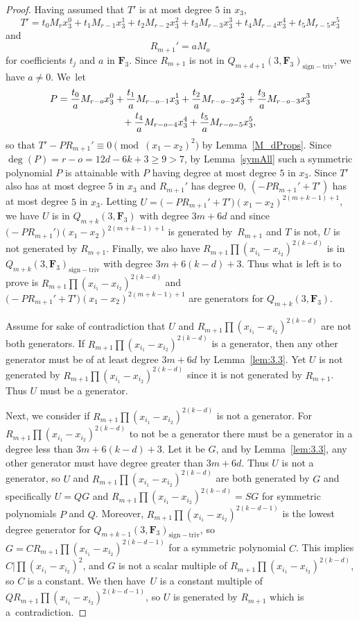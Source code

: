 \documentclass[pdftex]{sigma}
\theoremstyle{definition}
\numberwithin{equation}{section}
\newcommand{\siv}{\mathrm{sign-triv}}
\begin{document}
\begin{proof}
 Having assumed that $T'$ is at most degree $5$ in $x_3$,
 \[T' = t_0M_rx_3^0+t_1M_{r-1}x_3^1+t_2M_{r-2}x_3^2+t_3M_{r-3}x_3^3+t_4M_{r-4}x_3^4+t_5M_{r-5}x_3^5\]
 and
 \[R_{m+1}'=aM_{o}\]
 for coefficients $t_j$ and $a$ in $\mathbf{F}_3$. Since $R_{m+1}$ is not in $Q_{m+d+1}(3,\mathbf{F}_3)_{\siv}$, we have $a\neq 0$. We~let
 \begin{gather*}
 P = \frac{t_0}{a}M_{r-o}x_3^0+\frac{t_1}{a}M_{r-o-1}x_3^1+\frac{t_2}{a}M_{r-o-2}x_3^2+\frac{t_3}{a}M_{r-o-3}x_3^3\\
 \hphantom{P =}{}
 +\frac{t_4}{a}M_{r-o-4}x_3^4+\frac{t_5}{a}M_{r-o-5}x_3^5,
 \end{gather*}
 so that $T'-PR_{m+1}'\equiv 0\pmod{(x_1-x_2)^2}$ by Lemma~\ref{M_dProps}. Since $\deg(P) = r-o = 12d-6k+3\geq 9>7$, by Lemma~\ref{symAll} such a symmetric polynomial $P$ is attainable with $P$ having degree at most degree $5$ in $x_3$.
 Since $T'$ also has at most degree $5$ in $x_3$ and $R_{m+1}'$ has degree $0$, $(-PR_{m+1}'+T')$ has at most degree $5$ in $x_3$. Letting $U=\bigl(-PR_{m+1}'+T'\bigr)(x_1-x_2)^{2(m+k-1)+1}$, we have $U$ is in $Q_{m+k}(3,\mathbf{F}_3)$ with degree $3m+6d$ and since $\bigl(-PR_{m+1}'\bigr)(x_1-x_2)^{2(m+k-1)+1}$ is generated by~$R_{m+1}$ and $T$ is not, $U$ is not generated by $R_{m+1}$. Finally, we also have $R_{m+1}\prod (x_{i_1}-x_{i_2})^{2(k-d)}$ is in $Q_{m+k}(3,\mathbf{F}_3)_{\siv}$ with degree $3m+6(k-d)+3$. Thus what is left is to prove is $R_{m+1}\prod (x_{i_1}-x_{i_2})^{2(k-d)}$ and $\bigl(-PR_{m+1}'+T'\bigr)(x_1-x_2)^{2(m+k-1)+1}$ are generators for $Q_{m+k}(3,\mathbf{F}_3)$.

 Assume for sake of contradiction that $U$ and $R_{m+1}\prod (x_{i_1}-x_{i_2})^{2(k-d)}$ are not both generators. If $R_{m+1}\prod (x_{i_1}-x_{i_2})^{2(k-d)}$ is a generator, then any other generator must be of at least degree $3m+6d$ by Lemma~\ref{lem:3.3}. Yet $U$ is not generated by $R_{m+1}\prod (x_{i_1}-x_{i_2})^{2(k-d)}$ since it is not generated by $R_{m+1}$. Thus $U$ must be a generator.

 Next, we consider if $R_{m+1}\prod (x_{i_1}-x_{i_2})^{2(k-d)}$ is not a generator. For $R_{m+1}\prod (x_{i_1}-x_{i_2})^{2(k-d)}$ to not be a generator there must be a generator in a degree less than $3m+6(k-d)+3$. Let it be $G$, and by Lemma~\ref{lem:3.3}, any other generator must have degree greater than $3m+6d$. Thus $U$ is not a generator, so $U$ and $R_{m+1}\prod (x_{i_1}-x_{i_2})^{2(k-d)}$ are both generated by $G$ and specifically $U=QG$ and $R_{m+1}\prod (x_{i_1}-x_{i_2})^{2(k-d)}=SG$ for symmetric polynomials $P$ and $Q$. Moreover, $R_{m+1}\prod (x_{i_1}-x_{i_2})^{2(k-d-1)}$ is the lowest degree generator for $Q_{m+k-1}(3,\mathbf{F}_3)_{\siv}$, so $G=CR_{m+1}\prod (x_{i_1}-x_{i_2})^{2(k-d-1)}$ for a symmetric polynomial $C$. This implies $C|\prod(x_{i_1}-x_{i_2})^2$, and $G$ is not a scalar multiple of $R_{m+1}\prod (x_{i_1}-x_{i_2})^{2(k-d)}$, so $C$ is a constant. We then have~$U$ is a constant multiple of $QR_{m+1}\prod (x_{i_1}-x_{i_2})^{2(k-d-1)}$, so $U$ is generated by $R_{m+1}$ which is a~contradiction.


\end{proof}
\end{document}
